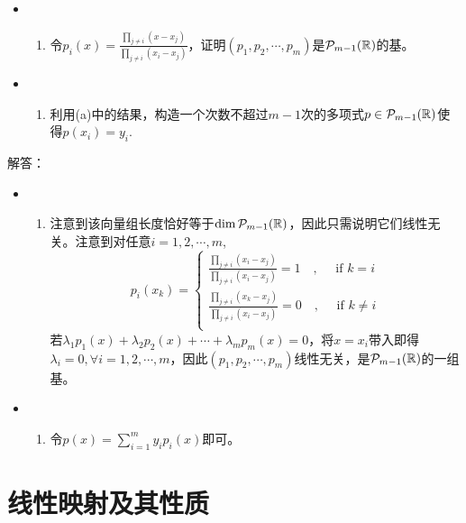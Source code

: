 \documentclass[hyperref,]{ctexart}
\providecommand{\tightlist}{%
  \setlength{\itemsep}{0pt}\setlength{\parskip}{0pt}}
\begin{document}
\begin{itemize}
\item
  \begin{enumerate}
  \def\labelenumi{(\alph{enumi})}
  \tightlist
  \item
    令\(p_i(x) = \frac{\prod_{j\ne i}(x-x_j)}{\prod_{j\ne i}(x_i-x_j)}\)，证明\((p_1,p_2,\cdots,p_m)\)是\(\mathcal{P}_{m-1}(\mathbb{R})\)的基。
  \end{enumerate}
\item
  \begin{enumerate}
  \def\labelenumi{(\alph{enumi})}
  \setcounter{enumi}{1}
  \tightlist
  \item
    利用(a)中的结果，构造一个次数不超过\(m-1\)次的多项式\(p\in \mathcal{P}_{m-1}(\mathbb{R})\)使得\(p(x_i)=y_i\).
  \end{enumerate}
\end{itemize}

\noindent{} 解答：

\begin{itemize}
\item
  \begin{enumerate}
  \def\labelenumi{(\alph{enumi})}
  \tightlist
  \item
    注意到该向量组长度恰好等于\(\mathrm{dim}\,\mathcal{P}_{m-1}(\mathbb{R})\)，因此只需说明它们线性无关。注意到对任意\(i=1,2,\cdots,m\),
    \[p_i(x_k)=
    \begin{cases}
    \frac{\prod_{j\ne i}(x_i-x_j)}{\prod_{j\ne i}(x_i-x_j)}=1\quad,\quad\text{~if~} k=i\\
    \frac{\prod_{j\ne i}(x_k-x_j)}{\prod_{j\ne i}(x_i-x_j)}=0\quad,\quad\text{~if~} k\ne i\\
    \end{cases}
    \]
    若\(\lambda_1 p_1(x)+\lambda_2 p_2(x)+\cdots+\lambda_m p_m(x) =0\)，将\(x=x_i\)带入即得\(\lambda_i=0,\forall i=1,2,\cdots,m\)，因此\((p_1,p_2,\cdots,p_m)\)线性无关，是\(\mathcal{P}_{m-1}(\mathbb{R})\)的一组基。
  \end{enumerate}
\item
  \begin{enumerate}
  \def\labelenumi{(\alph{enumi})}
  \setcounter{enumi}{1}
  \tightlist
  \item
    令\(p(x) = \sum_{i=1}^m y_ip_i(x)\)即可。
  \end{enumerate}
\end{itemize}

\section{线性映射及其性质}\label{ux7ebfux6027ux6620ux5c04ux53caux5176ux6027ux8d28}
\end{document}
